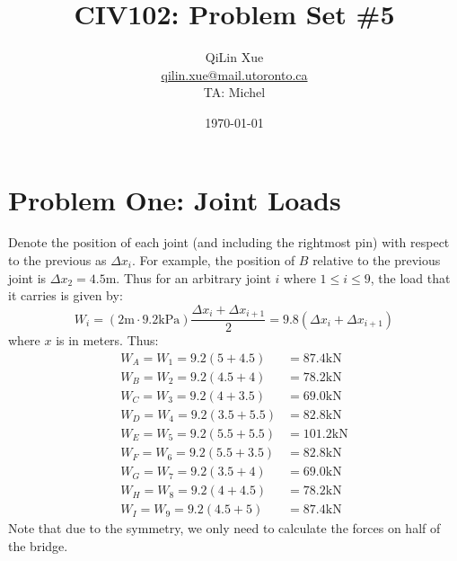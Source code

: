 \documentclass{article}
\title{CIV102: Problem Set \#5}
\author{QiLin Xue \\ \href{mailto:qilin.xue@mail.utoronto.ca}{qilin.xue@mail.utoronto.ca} \\ TA: Michel}
\date{\today}
\begin{document}
\maketitle
\section{Problem One: Joint Loads}
Denote the position of each joint (and including the rightmost pin) with respect to the previous as $\Delta x_i$. For example, the position of $B$ relative to the previous joint is $\Delta x_2=4.5\si{\meter}$. Thus for an arbitrary joint $i$ where $1 \le i \le 9$, the load that it carries is given by:
\begin{equation}
    W_i = (2 \si{\meter} \cdot 9.2\si{\kilo\pascal})\frac{\Delta x_i+\Delta x_{i+1}}{2}=9.8(\Delta x_i+\Delta x_{i+1})
    \label{eq:}
\end{equation}
where $x$ is in meters. Thus:
\begin{align}
    W_A=W_1 = 9.2( 5+4.5 ) &= \boxed{ 87.4 \si{\kilo\newton}} \\
    W_B=W_2 = 9.2( 4.5+ 4) &= \boxed{ 78.2 \si{\kilo\newton}} \\
    W_C=W_3 = 9.2( 4+ 3.5) &= \boxed{ 69.0 \si{\kilo\newton}} \\
    W_D=W_4 = 9.2( 3.5+ 5.5) &= \boxed{ 82.8\si{\kilo\newton}} \\
    W_E=W_5 = 9.2( 5.5+ 5.5) &= \boxed{ 101.2\si{\kilo\newton}} \\
    W_F=W_6 = 9.2( 5.5+ 3.5) &= \boxed{82.8\si{\kilo\newton}} \\
    W_G=W_7 = 9.2( 3.5+ 4) &= \boxed{69.0\si{\kilo\newton}} \\
    W_H=W_8 = 9.2( 4+ 4.5) &= \boxed{ 78.2\si{\kilo\newton}} \\
    W_I=W_9 = 9.2( 4.5+5 ) &= \boxed{ 87.4\si{\kilo\newton}}
\end{align}
Note that due to the symmetry, we only need to calculate the forces on half of the bridge.

\newpage
\end{document}
